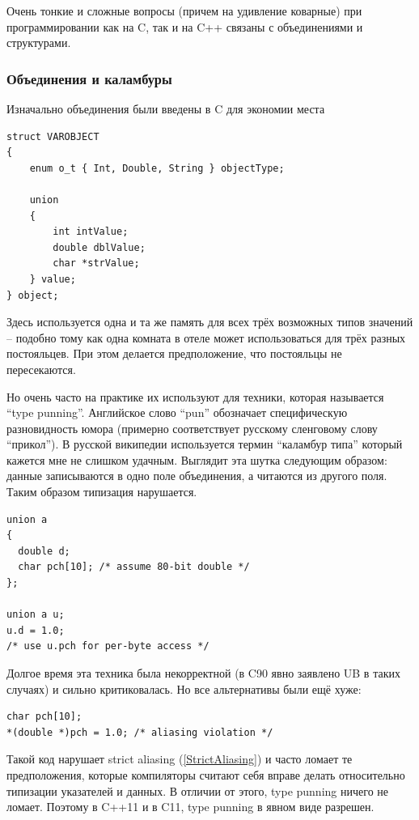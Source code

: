 \documentclass[a4paper,12pt,oneside]{article}
\begin{document}
Очень тонкие и сложные вопросы (причем на удивление коварные) при программировании как на C, так и на C++ связаны с объединениями и структурами.

\subsubsection{Объединения и каламбуры}

Изначально объединения были введены в C для экономии места

\begin{lstlisting}
struct VAROBJECT
{
    enum o_t { Int, Double, String } objectType;

    union
    {
        int intValue;
        double dblValue;
        char *strValue;
    } value;
} object;
\end{lstlisting}

Здесь используется одна и та же память для всех трёх возможных типов значений -- подобно тому как одна комната в отеле может использоваться для трёх разных постояльцев. При этом делается предположение, что постояльцы не пересекаются.

Но очень часто на практике их используют для техники, которая называется ``type punning''. Английское слово ``pun'' обозначает специфическую разновидность юмора (примерно соответствует русскому сленговому слову ``прикол''). В русской википедии используется термин ``каламбур типа'' который кажется мне не слишком удачным. Выглядит эта шутка следующим образом: данные записываются в одно поле объединения, а читаются из другого поля. Таким образом типизация нарушается.

\begin{lstlisting}
union a
{
  double d;
  char pch[10]; /* assume 80-bit double */
};

union a u;
u.d = 1.0;
/* use u.pch for per-byte access */
\end{lstlisting}

Долгое время эта техника была некорректной (в C90 явно заявлено UB в таких случаях) и сильно критиковалась. Но все альтернативы были ещё хуже:

\begin{lstlisting}
char pch[10];
*(double *)pch = 1.0; /* aliasing violation */
\end{lstlisting}

Такой код нарушает strict aliasing (\ref{StrictAliasing}) и часто ломает те предположения, которые компиляторы считают себя вправе делать относительно типизации указателей и данных. В отличии от этого, type punning ничего не ломает. Поэтому в C++11 и в C11, type punning в явном виде разрешен.
\end{document}

